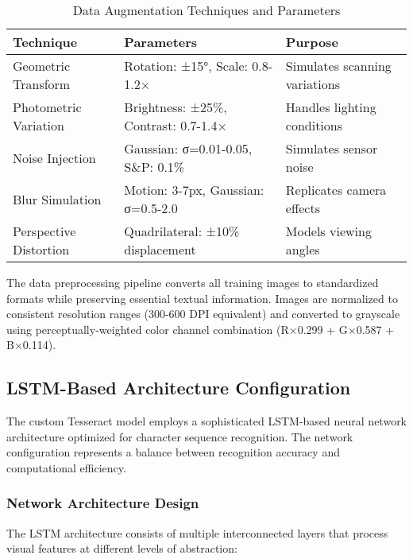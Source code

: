 \begin{table}[H]
\centering
\caption{Data Augmentation Techniques and Parameters}
\label{tab:augmentation_techniques}
{\begin{tabular}{lll}
\toprule
\textbf{Technique} & \textbf{Parameters} & \textbf{Purpose} \\
\midrule
Geometric Transform & Rotation: ±15°, Scale: 0.8-1.2× & Simulates scanning variations \\
Photometric Variation & Brightness: ±25\%, Contrast: 0.7-1.4× & Handles lighting conditions \\
Noise Injection & Gaussian: σ=0.01-0.05, S\&P: 0.1\% & Simulates sensor noise \\
Blur Simulation & Motion: 3-7px, Gaussian: σ=0.5-2.0 & Replicates camera effects \\
Perspective Distortion & Quadrilateral: ±10\% displacement & Models viewing angles \\
\bottomrule
\end{tabular}}
\end{table}

The data preprocessing pipeline converts all training images to standardized formats while preserving essential textual information. Images are normalized to consistent resolution ranges (300-600 DPI equivalent) and converted to grayscale using perceptually-weighted color channel combination (R×0.299 + G×0.587 + B×0.114).

\subsection{LSTM-Based Architecture Configuration}

The custom Tesseract model employs a sophisticated LSTM-based neural network architecture optimized for character sequence recognition. The network configuration represents a balance between recognition accuracy and computational efficiency.

\subsubsection{Network Architecture Design}

The LSTM architecture consists of multiple interconnected layers that process visual features at different levels of abstraction:

